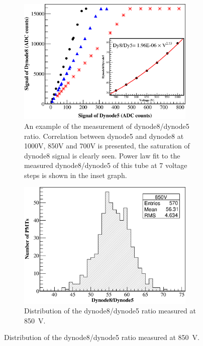 \documentclass{nst}
\begin{document}

\begin{figure}[!tb]
	
	\begin{subfigure}[t]{85mm}
		\includegraphics[width=85mm]{FIG10}
		\caption{An example of the measurement of dynode8/dynode5 ratio. Correlation between dynode5 and dynode8 at 1000V, 850V and 700V is presented, the saturation of dynode8 signal is clearly seen. Power law fit to the measured dynode8/dynode5 of this tube at 7 voltage steps is shown in the inset graph.}
	\end{subfigure}
	\begin{subfigure}[t]{85mm}
		\includegraphics[width=85mm]{dy58_dist_850V}
		\caption{Distribution of the dynode8/dynode5 ratio measured at \SI{850}{\volt}.}
	\end{subfigure}
	

\end{figure}
\end{document}
